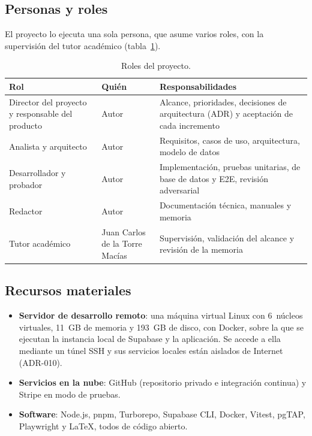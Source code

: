 \subsection{Personas y roles}

El proyecto lo ejecuta una sola persona, que asume varios roles, con la
supervisión del tutor académico (tabla~\ref{tab:plan-roles}).

\begin{table}[htbp]
  \centering
  \small
  \caption{Roles del proyecto.}
  \label{tab:plan-roles}
  \begin{tabularx}{\textwidth}{@{}>{\raggedright\arraybackslash}p{3.8cm}>{\raggedright\arraybackslash}p{3.2cm}X@{}}
    \toprule
    \textbf{Rol} & \textbf{Quién} & \textbf{Responsabilidades} \\
    \midrule
    Director del proyecto y responsable del producto & Autor & Alcance, prioridades, decisiones de arquitectura (ADR) y aceptación de cada incremento \\
    Analista y arquitecto & Autor & Requisitos, casos de uso, arquitectura, modelo de datos \\
    Desarrollador y probador & Autor & Implementación, pruebas unitarias, de base de datos y E2E, revisión adversarial \\
    Redactor & Autor & Documentación técnica, manuales y memoria \\
    Tutor académico & Juan Carlos de la Torre Macías & Supervisión, validación del alcance y revisión de la memoria \\
    \bottomrule
  \end{tabularx}
\end{table}

\subsection{Recursos materiales}

\begin{itemize}
  \item \textbf{Servidor de desarrollo remoto}: una máquina virtual Linux
        con 6~núcleos virtuales, 11~GB de memoria y 193~GB de disco, con
        Docker, sobre la que se ejecutan la instancia local de Supabase y la
        aplicación. Se accede a ella mediante un túnel SSH y sus servicios
        locales están aislados de Internet (ADR-010).
  \item \textbf{Servicios en la nube}: GitHub (repositorio privado e
        integración continua) y Stripe en modo de pruebas.
  \item \textbf{Software}: Node.js, pnpm, Turborepo, Supabase CLI, Docker,
        Vitest, pgTAP, Playwright y \LaTeX{}, todos de código abierto.
\end{itemize}

